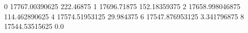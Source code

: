 0 17767.00390625 222.46875
1 17696.71875 152.18359375
2 17658.998046875 114.462890625
4 17574.51953125 29.984375
6 17547.876953125 3.341796875
8 17544.53515625 0.0

